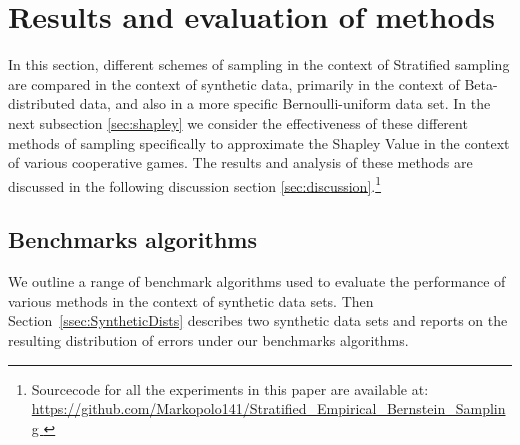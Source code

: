 

\newpage
\section{Results and evaluation of methods}\label{section:statistics_results}


In this section, different schemes of sampling in the context of Stratified sampling are compared in the context of synthetic data, primarily in the context of Beta-distributed data, and also in a more specific Bernoulli-uniform data set.
In the next subsection \ref{sec:shapley} we consider the effectiveness of these different methods of sampling specifically to approximate the Shapley Value in the context of various cooperative games.
The results and analysis of these methods are discussed in the following discussion section \ref{sec:discussion}.\footnote{
Sourcecode for all the experiments in this paper are available at:\\ \href{https://github.com/Markopolo141/Stratified\_Empirical\_Bernstein\_Sampling}{https://github.com/Markopolo141/Stratified\_Empirical\_Bernstein\_Sampling
}}

\subsection{Benchmarks algorithms}
We outline a range of benchmark algorithms used to evaluate the performance of various methods in the context of synthetic data sets.
Then Section~\ref{ssec:SyntheticDists} describes two synthetic data sets and reports on the resulting distribution of errors under our benchmarks algorithms.


